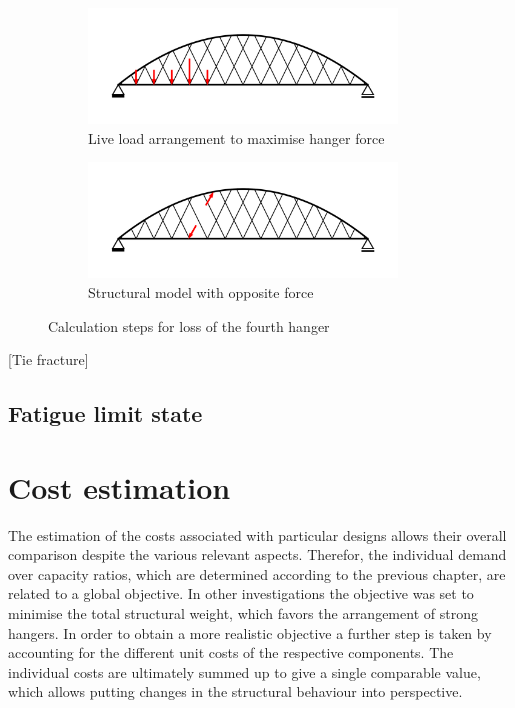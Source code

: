 \begin{figure}[H]
\centering
\begin{subfigure}{0.5\textwidth}
    \centering
    \includegraphics[trim={0 0.8cm 0 0.8cm},clip, width=0.9\textwidth]{illustrations/figures/cable loss - load arrangement.png}
    \caption{Live load arrangement to maximise hanger force}
    \label{fig:Cable_Loss_1}
\end{subfigure}%
\begin{subfigure}{.5\textwidth}
    \centering
    \includegraphics[trim={0 0.8cm 0 0.8cm},clip, width=0.9\textwidth]{illustrations/figures/cable loss.png}
    \caption{Structural model with opposite force}
    \label{fig:Cable_Loss_2}
\end{subfigure}
\caption{Calculation steps for loss of the fourth hanger}
\label{fig:Cable_Loss}
\end{figure}

[Tie fracture]

\subsection{Fatigue limit state}



\newpage
\section{Cost estimation} \label{sec:met_cost}
The estimation of the costs associated with particular designs allows their overall comparison despite the various relevant aspects. Therefor, the individual demand over capacity ratios, which are determined according to the previous chapter, are related to a global objective. In other investigations the objective was set to minimise the total structural weight, which favors the arrangement of strong hangers. In order to obtain a more realistic objective a further step is taken by accounting for the different unit costs of the respective components. The individual costs are ultimately summed up to give a single comparable value, which allows putting changes in the structural behaviour into perspective. \medskip

